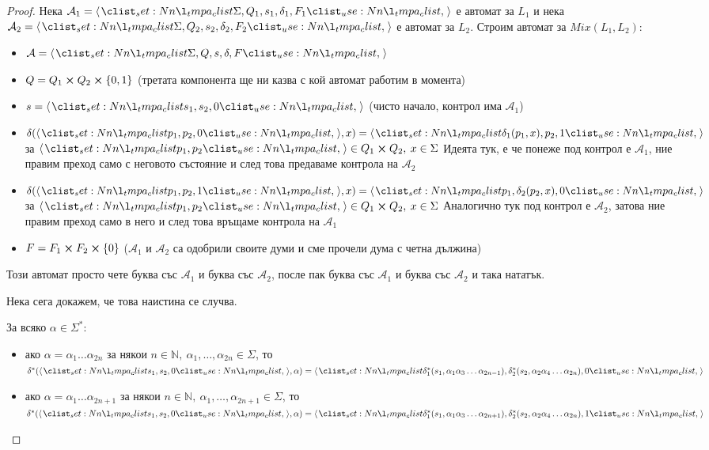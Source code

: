 \begin{proof}
    Нека $\mathcal{A}_1 = \opair{\Sigma, Q_1, s_1, \delta_1, F_1}$ е автомат за $L_1$ и нека $\mathcal{A}_2 = \opair{\Sigma, Q_2, s_2, \delta_2, F_2}$ е автомат за $L_2$.
    Строим автомат за $Mix(L_1, L_2)$:
    \begin{itemize}
        \item $\mathcal{A} = \opair{\Sigma, Q, s, \delta, F}$
        \item $Q = Q_1 \cross Q_2 \cross \{ 0, 1 \}$ (третата компонента ще ни казва с кой автомат работим в момента)
        \item $s = \opair{s_1, s_2, 0}$ (чисто начало, контрол има $\mathcal{A}_1$)
        \item $\delta(\opair{p_1, p_2, 0}, x) = \opair{\delta_1(p_1, x), p_2, 1}$ за $\opair{p_1, p_2} \in Q_1 \cross Q_2, \: x \in \Sigma$
              Идеята тук, е че понеже под контрол е $\mathcal{A}_1$, ние правим преход само с неговото състояние и след това предаваме контрола на $\mathcal{A}_2$
        \item $\delta(\opair{p_1, p_2, 1}, x) = \opair{p_1, \delta_2(p_2, x), 0}$ за $\opair{p_1, p_2} \in Q_1 \cross Q_2, \: x \in \Sigma$
              Аналогично тук под контрол е $\mathcal{A}_2$, затова ние правим преход само в него и след това връщаме контрола на $\mathcal{A}_1$
        \item $F = F_1 \cross F_2 \cross \{ 0 \}$ ($\mathcal{A}_1$ и $\mathcal{A}_2$ са одобрили своите думи и сме прочели дума с четна дължина)
    \end{itemize}

    Този автомат просто чете буква със $\mathcal{A}_1$ и буква със $\mathcal{A}_2$, после пак буква със $\mathcal{A}_1$ и буква със $\mathcal{A}_2$ и така нататък.

    \pagebreak

    Нека сега докажем, че това наистина се случва.

    \begin{claim}
        За всяко $\alpha \in \Sigma^*$:
        \begin{itemize}
            \item ако $\alpha = \alpha_1 \dots \alpha_{2n}$ за някои $n \in \mathbb{N}, \: \alpha_1, \dots, \alpha_{2n} \in \Sigma$, то \\
                  $\delta^*(\opair{s_1, s_2, 0}, \alpha) = \opair{\delta_1^*(s_1, \alpha_1 \alpha_3 \dots \alpha_{2n - 1}), \delta_2^*(s_2, \alpha_2 \alpha_4 \dots \alpha_{2n}), 0}$
            \item ако $\alpha = \alpha_1 \dots \alpha_{2n + 1}$ за някои $n \in \mathbb{N}, \: \alpha_1, \dots, \alpha_{2n + 1} \in \Sigma$, то \\
                  $\delta^*(\opair{s_1, s_2, 0}, \alpha) = \opair{\delta_1^*(s_1, \alpha_1 \alpha_3 \dots \alpha_{2n + 1}), \delta_2^*(s_2, \alpha_2 \alpha_4 \dots \alpha_{2n}), 1}$
        \end{itemize}
    \end{claim}


\end{proof}
